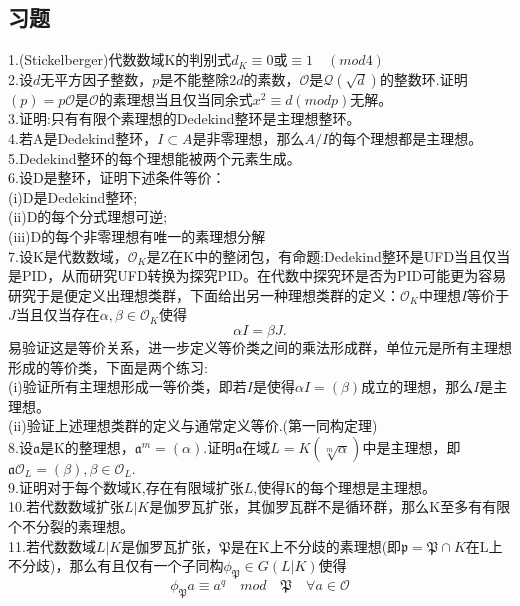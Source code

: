 \documentclass[UTF8]{article}
\begin{document}
    \subsection{习题}
    1.(Stickelberger)代数数域K的判别式$d_{K}\equiv 0$或$\equiv 1\quad (mod 4)$\\
    2.设$d$无平方因子整数，$p$是不能整除$2d$的素数，$\mathcal{O}$是$\mathcal{Q}(\sqrt{d})$的整数环.证明$(p)=p\mathcal{O}$是$\mathcal{O}$的素理想当且仅当同余式$x^{2}\equiv d(modp)$无解。\\
    3.证明:只有有限个素理想的Dedekind整环是主理想整环。\\
    4.若A是Dedekind整环，$I\subset A$是非零理想，那么$A/I$的每个理想都是主理想。\\
    5.Dedekind整环的每个理想能被两个元素生成。\\
    6.设D是整环，证明下述条件等价：\\
    (i)D是Dedekind整环;\\
    (ii)D的每个分式理想可逆;\\
    (iii)D的每个非零理想有唯一的素理想分解\\
    7.设K是代数数域，$\mathcal{O}_{K}$是Z在K中的整闭包，有命题:Dedekind整环是UFD当且仅当是PID，从而研究UFD转换为探究PID。在代数中探究环是否为PID可能更为容易研究于是便定义出理想类群，下面给出另一种理想类群的定义：$\mathcal{O}_{K}$中理想$I$等价于$J$当且仅当存在$\alpha,\beta \in \mathcal{O}_{K}$使得$$\alpha I=\beta J.$$易验证这是等价关系，进一步定义等价类之间的乘法形成群，单位元是所有主理想形成的等价类，下面是两个练习:\\
    (i)验证所有主理想形成一等价类，即若$I$是使得$\alpha I=(\beta)$成立的理想，那么$I$是主理想。\\
    (ii)验证上述理想类群的定义与通常定义等价.(第一同构定理)\\
    8.设$\mathfrak{a}$是K的整理想，$\mathfrak{a}^{m}=(\alpha).$证明$\mathfrak{a}$在域$L=K(\sqrt[m]{\alpha})$中是主理想，即$\mathfrak{a}\mathcal{O}_{L}=(\beta),\beta\in\mathcal{O}_{L}.$\\
    9.证明对于每个数域K,存在有限域扩张$L$,使得K的每个理想是主理想。\\
    10.若代数数域扩张$L|K$是伽罗瓦扩张，其伽罗瓦群不是循环群，那么K至多有有限个不分裂的素理想。\\
    11.若代数数域$L|K$是伽罗瓦扩张，$\mathfrak{P}$是在K上不分歧的素理想(即$\mathfrak{p}=\mathfrak{P}\cap K$在L上不分歧)，那么有且仅有一个子同构$\phi_{\mathfrak{P}}\in G(L|K)$使得$$
    \phi_{\mathfrak{P}}a\equiv a^{q}\quad mod \quad \mathfrak{P} \quad \forall a\in \mathcal{O}
    $$
\end{document}
